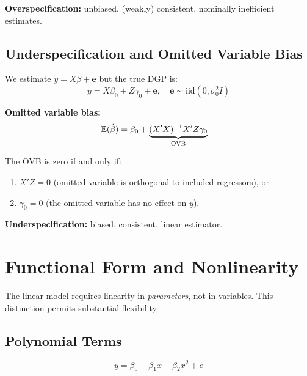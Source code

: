 \begin{tcolorbox}[keyresult]
\textbf{Overspecification:} unbiased, (weakly) consistent, nominally
inefficient estimates.
\end{tcolorbox}

\subsection{Underspecification and Omitted Variable Bias}
\label{subsec_OVB}

We estimate $y = X\beta + \mathbf{e}$ but the true DGP is:
\begin{equation}
  y = X\beta_0 + Z\gamma_0 + \mathbf{e},
  \quad \mathbf{e}\sim\text{iid}(0,\sigma_0^2I)
\end{equation}

\noindent\textbf{Omitted variable bias:}
\begin{align}
  \mathbb{E}(\hat\beta)
  &= \beta_0 + \underbrace{(X'X)^{-1}X'Z\gamma_0}_{\text{OVB}}
\end{align}

\begin{tcolorbox}[keyresult]
The OVB is zero if and only if:
\begin{enumerate}
  \item $X'Z = 0$ (omitted variable is orthogonal to included regressors), or
  \item $\gamma_0 = 0$ (the omitted variable has no effect on $y$).
\end{enumerate}
\end{tcolorbox}

\begin{tcolorbox}[keyresult]
\textbf{Underspecification:} biased, consistent, linear estimator.
\end{tcolorbox}


\section{Functional Form and Nonlinearity}
\label{sec_FunctionalForm}

The linear model requires linearity in \emph{parameters}, not in variables.
This distinction permits substantial flexibility.

\subsection{Polynomial Terms}

\begin{equation}
  y = \beta_0 + \beta_1 x + \beta_2 x^2 + e
\end{equation}


